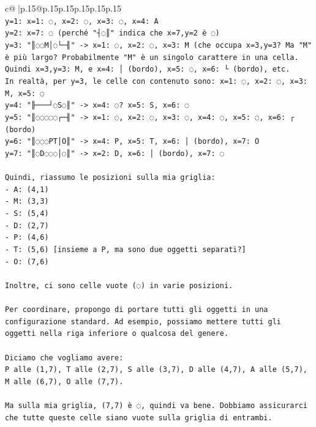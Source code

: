 \documentclass{article}
\begin{document}
{\begin{supertabular}{c@{$\;$}|p{.15\linewidth}@{}p{.15\linewidth}p{.15\linewidth}p{.15\linewidth}p{.15\linewidth}p{.15\linewidth}}
{{{\\ 
\texttt{y=1: x=1: ◌, x=2: ◌, x=3: ◌, x=4: A} \\
\texttt{y=2: x=7: ◌  (perché "┤◌║" indica che x=7,y=2 è ◌)} \\
\texttt{y=3: "║◌◌M│◌└─╢" {-}> x=1: ◌, x=2: ◌, x=3: M (che occupa x=3,y=3? Ma "M" è più largo? Probabilmente "M" è un singolo carattere in una cella. Quindi x=3,y=3: M, e x=4: │ (bordo), x=5: ◌, x=6: └ (bordo), etc.} \\
\texttt{In realtà, per y=3, le celle con contenuto sono: x=1: ◌, x=2: ◌, x=3: M, x=5: ◌} \\
\texttt{y=4: "╟───┘◌S◌║" {-}> x=4: ◌? x=5: S, x=6: ◌} \\
\texttt{y=5: "║◌◌◌◌◌┌─╢" {-}> x=1: ◌, x=2: ◌, x=3: ◌, x=4: ◌, x=5: ◌, x=6: ┌ (bordo)} \\
\texttt{y=6: "║◌◌◌PT│O║" {-}> x=4: P, x=5: T, x=6: │ (bordo), x=7: O} \\
\texttt{y=7: "║◌D◌◌◌│◌║" {-}> x=2: D, x=6: │ (bordo), x=7: ◌} \\
\\ 
\texttt{Quindi, riassumo le posizioni sulla mia griglia:} \\
\texttt{{-} A: (4,1)} \\
\texttt{{-} M: (3,3)} \\
\texttt{{-} S: (5,4)} \\
\texttt{{-} D: (2,7)} \\
\texttt{{-} P: (4,6)} \\
\texttt{{-} T: (5,6)  {[}insieme a P, ma sono due oggetti separati?{]}} \\
\texttt{{-} O: (7,6)} \\
\\ 
\texttt{Inoltre, ci sono celle vuote (◌) in varie posizioni.} \\
\\ 
\texttt{Per coordinare, propongo di portare tutti gli oggetti in una configurazione standard. Ad esempio, possiamo mettere tutti gli oggetti nella riga inferiore o qualcosa del genere.} \\
\\ 
\texttt{Diciamo che vogliamo avere:} \\
\texttt{P alle (1,7), T alle (2,7), S alle (3,7), D alle (4,7), A alle (5,7), M alle (6,7), O alle (7,7).} \\
\\ 
\texttt{Ma sulla mia griglia, (7,7) è ◌, quindi va bene. Dobbiamo assicurarci che tutte queste celle siano vuote sulla griglia di entrambi.} \\
}}}
\end{supertabular}}
\end{document}
